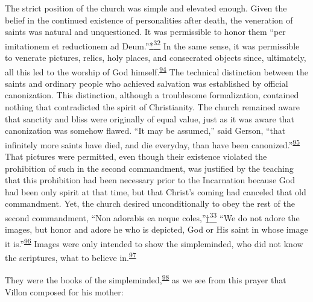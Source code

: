 The strict position of the church was simple and elevated enough. Given
the belief in the continued existence of personalities after death, the
veneration of saints was natural and unquestioned. It was permissible to
honor them ``per imitationem et reductionem ad
Deum.''\protect\hypertarget{13_Chapter_Six__THE_DEPICTION_OF_TH.xhtmlux5cux23id_3051}{\protect\hyperlink{23_NOTES.xhtmlux5cux23id_3052}{*\textsuperscript{32}}}
In the same sense, it was permissible to venerate pictures, relics, holy
places, and consecrated objects since, ultimately, all this led to the
worship of God
himself.\textsuperscript{\protect\hypertarget{13_Chapter_Six__THE_DEPICTION_OF_TH.xhtmlux5cux23id_1084}{\protect\hyperlink{23_NOTES.xhtmlux5cux23id_1085}{94}}}
The technical distinction between the saints and ordinary people who
achieved salvation was established by official canonization. This
distinction, although a troublesome formalization, contained nothing
that contradicted the spirit of Christianity. The church remained aware
that sanctity and bliss were originally of equal value, just as it was
aware that canonization was somehow flawed. ``It may be assumed,'' said
Gerson, ``that infinitely more saints have died, and die everyday, than
have been
canonized.''\textsuperscript{\protect\hypertarget{13_Chapter_Six__THE_DEPICTION_OF_TH.xhtmlux5cux23id_1082}{\protect\hyperlink{23_NOTES.xhtmlux5cux23id_1083}{95}}}
That pictures were permitted, even though their existence violated the
prohibition of such in the second commandment, was justified by the
teaching that this prohibition had been necessary prior to the
Incarnation because God had been only spirit at that time, but that
Christ's coming had canceled that old commandment. Yet, the church
desired unconditionally to obey the rest of the second commandment,
``Non adorabis ea neque
coles,''\protect\hypertarget{13_Chapter_Six__THE_DEPICTION_OF_TH.xhtmlux5cux23id_3053}{\protect\hyperlink{23_NOTES.xhtmlux5cux23id_3054}{†\textsuperscript{33}}}
``We do not adore the images, but honor and adore he who is depicted,
God or His saint in whose image it
is.''\textsuperscript{\protect\hypertarget{13_Chapter_Six__THE_DEPICTION_OF_TH.xhtmlux5cux23id_1080}{\protect\hyperlink{23_NOTES.xhtmlux5cux23id_1081}{96}}}
Images were only intended to show the simpleminded, who did not know the
scriptures, what to believe
in.\textsuperscript{\protect\hypertarget{13_Chapter_Six__THE_DEPICTION_OF_TH.xhtmlux5cux23id_1078}{\protect\hyperlink{23_NOTES.xhtmlux5cux23id_1079}{97}}}

\protect\hypertarget{13_Chapter_Six__THE_DEPICTION_OF_TH.xhtmlux5cux23page_191}{}{}They
were the books of the
simpleminded,\textsuperscript{\protect\hypertarget{13_Chapter_Six__THE_DEPICTION_OF_TH.xhtmlux5cux23id_1076}{\protect\hyperlink{23_NOTES.xhtmlux5cux23id_1077}{98}}}
as we see from this prayer that Villon composed for his mother:

